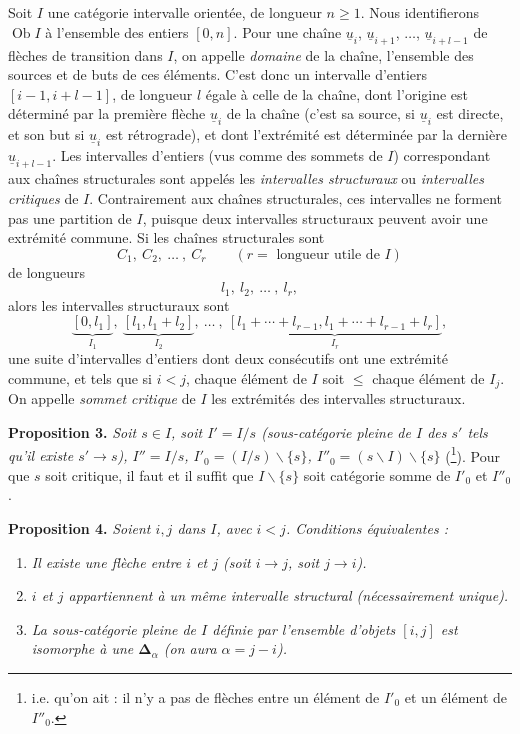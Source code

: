 \documentclass[11pt]{article}
\newcommand{\msp}[1]{\marginpar{\raggedright\footnotesize [#1]}}
\newcommand{\bD}{\boldsymbol{\Delta}}
\begin{document}
Soit $I$ une catégorie intervalle orientée, de longueur $n \geq 1$. Nous identifierons $\operatorname{Ob} I$ à l'ensemble des entiers $[0,n]$. Pour une chaîne $\underline{u}_i$, $\underline{u}_{i+1}$, $\ldots$, $\underline{u}_{i+l-1}$ de flèches de transition dans $I$, on appelle \textit{domaine} de la chaîne, l'ensemble des sources et de buts de ces éléments. C'est donc un intervalle d'entiers $[i-1, i+l-1]$, de longueur $l$ égale à celle de la chaîne, dont l'origine est déterminé %
par la première flèche $\underline{u}_i$ de la chaîne (c'est sa source, si $\underline{u}_i$ est directe, et son but si $\underline{u}_i$ est rétrograde), et dont l'extrémité est déterminée par la dernière $\underline{u}_{i+l-1}$. Les intervalles d'entiers (vus comme des sommets de $I$) correspondant aux chaînes structurales sont appelés les \textit{intervalles structuraux} ou \textit{intervalles critiques} de $I$. Contrairement aux chaînes structurales, ces intervalles ne forment pas une partition de $I$, puisque deux intervalles structuraux peuvent avoir une extrémité commune. Si les chaînes structurales sont
\[
C_1,\ C_2,\ \ldots\ ,\ C_r \qquad (r = \text{ longueur utile de } I)
\]
de longueurs
\[
l_1,\ l_2,\ \ldots\ ,\ l_r,
\]
alors les intervalles structuraux sont
\[
\underbrace{[0,l_1]}_{I_1},\ \underbrace{[l_1,l_1+l_2]}_{I_2},\ \ldots\ ,\ \underbrace{[l_1+\cdots+l_{r-1},l_1+\cdots+l_{r-1}+l_r]}_{I_r},
\]
une suite d'intervalles d'entiers dont deux consécutifs ont une extrémité commune, et tels que si $i < j$, chaque élément de $I$ %
soit $\leq$ chaque élément de $I_j$. On appelle \textit{sommet critique} de $I$ les extrémités des intervalles structuraux.

\textbf{Proposition 3.} \textit{Soit $s \in I$, soit $I' = I/s$ (sous-catégorie pleine de $I$ des $s'$ tels qu'il existe $s' \longrightarrow s$), $I'' = I/s$, $I'_0 = (I/s)\backslash\{s\}$, $I''_0 = (s\backslash I)\backslash\{s\}$} (\footnote[3]{i.e. qu'on ait : il n'y a pas de flèches entre un élément de $I'_0$ et un élément de $I''_0$.}). Pour que $s$ soit critique, il faut et il suffit que $I\backslash\{s\}$ soit catégorie somme de $I'_0$ et $I''_0$.

\msp{page 11}

\textbf{Proposition 4.} \textit{Soient $i,j$ dans $I$, avec $i < j$. Conditions équivalentes :}
\begin{enumerate}
\item[\textit{a)}] \textit{Il existe une flèche entre $i$ et $j$ (soit $i \longrightarrow j$, soit $j \longrightarrow i$).}
\item[\textit{b)}] \textit{$i$ et $j$ appartiennent à un même intervalle structural (nécessairement unique).}
\item[\textit{c)}] \textit{La sous-catégorie pleine de $I$ définie par l'ensemble d'objets $[i,j]$ est isomorphe à une $\bD_\alpha$ (on aura $\alpha = j-i$).}
\end{enumerate}
\end{document}
